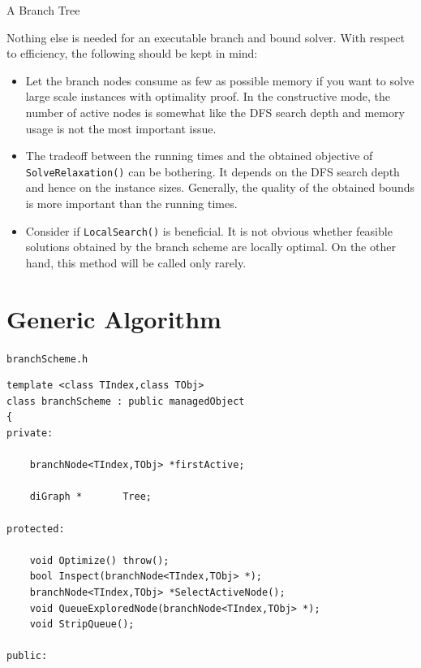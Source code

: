 \documentclass[a4paper,11pt,twoside]{book}
\begin{document}
\begin{multicols}{2}
\bigskip
\begin{figurehere}
\begin{center}
\epsfxsize=12cm
\vspace{0.5cm}
\caption{\label{flb_branch}A Branch Tree}
\end{center}
\end{figurehere}

Nothing else is needed for an executable branch and bound solver. With respect
to efficiency, the following should be kept in mind:
\begin{itemize}
\item Let the branch nodes consume as few as possible memory if you want to
    solve large scale instances with optimality proof. In the constructive
    mode, the number of active nodes is somewhat like the DFS search depth
    and memory usage is not the most important issue.
\item The tradeoff between the running times and the obtained objective of
    \verb/SolveRelaxation()/ can be bothering. It depends on the DFS search
    depth and hence on the instance sizes. Generally, the quality of the
    obtained bounds is more important than the running times.
\item Consider if \verb/LocalSearch()/ is beneficial. It is not obvious whether
    feasible solutions obtained by the branch scheme are locally optimal. On
    the other hand, this method will be called only rarely.
\end{itemize}


\section{Generic Algorithm}
\label{slb_bbscheme}
\myinclude\verb/branchScheme.h/
\begin{mymethods}
\begin{verbatim}
template <class TIndex,class TObj>
class branchScheme : public managedObject
{
private:

    branchNode<TIndex,TObj> *firstActive;

    diGraph *       Tree;

protected:

    void Optimize() throw();
    bool Inspect(branchNode<TIndex,TObj> *);
    branchNode<TIndex,TObj> *SelectActiveNode();
    void QueueExploredNode(branchNode<TIndex,TObj> *);
    void StripQueue();

public:


\end{verbatim}
\end{mymethods}
\end{multicols}
\end{document}
